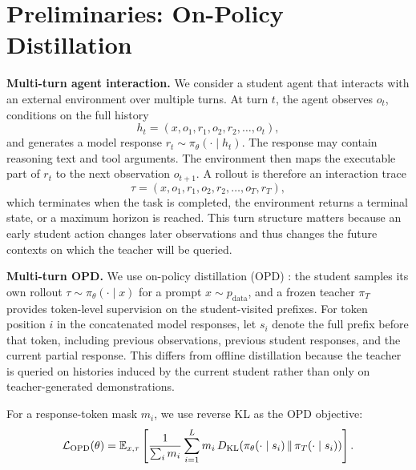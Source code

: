 \section{Preliminaries: On-Policy Distillation}
\label{sec:prelim}
\textbf{Multi-turn agent interaction.}
We consider a student agent that interacts with an external environment over
multiple turns. At turn $t$, the agent observes $o_t$, conditions on the full
history
\[
h_t=(x,o_1,r_1,o_2,r_2,\ldots,o_t),
\]
and generates a model response $r_t\sim\pi_\theta(\cdot\mid h_t)$. The response
may contain reasoning text and tool arguments. The
environment then maps the executable part of $r_t$ to the next observation
$o_{t+1}$. A rollout is therefore an interaction trace
\[
\tau=(x,o_1,r_1,o_2,r_2,\ldots,o_T,r_T),
\]
which terminates when the task is completed, the environment returns a terminal
state, or a maximum horizon is reached. This turn structure matters because an
early student action changes later observations and thus changes the future
contexts on which the teacher will be queried.

\textbf{Multi-turn OPD.}
We use on-policy distillation (OPD) \citep{lu2025onpolicydistillation}: the student
samples its own rollout $\tau\sim\pi_\theta(\cdot\mid x)$ for a prompt
$x\sim p_{\mathrm{data}}$, and a frozen teacher $\pi_T$ provides token-level
supervision on the student-visited prefixes. For token position $i$ in the
concatenated model responses, let $s_i$ denote the full prefix before that token,
including previous observations, previous student responses, and the current
partial response. This differs from offline distillation because the teacher is
queried on histories induced by the current student rather than only on
teacher-generated demonstrations.

For a response-token mask $m_i$, we use reverse KL as the OPD objective:
\begin{equation}
\mathcal{L}_{\mathrm{OPD}}(\theta)
=
\mathbb{E}_{x,\tau}
\left[
\frac{1}{\sum_i m_i}
\sum_{i=1}^{L}
m_i\,
D_{\mathrm{KL}}\!\left(
\pi_\theta(\cdot\mid s_i)\,\|\,\pi_T(\cdot\mid s_i)
\right)
\right].
\label{eq:opd-rkl}
\end{equation}
